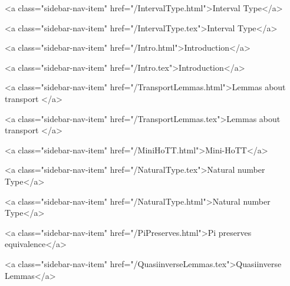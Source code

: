       
        
          <a class="sidebar-nav-item" href="/IntervalType.html">Interval Type</a>
        
      
    
      
        
          <a class="sidebar-nav-item" href="/IntervalType.tex">Interval Type</a>
        
      
    
      
        
          <a class="sidebar-nav-item" href="/Intro.html">Introduction</a>
        
      
    
      
        
          <a class="sidebar-nav-item" href="/Intro.tex">Introduction</a>
        
      
    
      
        
          <a class="sidebar-nav-item" href="/TransportLemmas.html">Lemmas about transport </a>
        
      
    
      
        
          <a class="sidebar-nav-item" href="/TransportLemmas.tex">Lemmas about transport </a>
        
      
    
      
        
          <a class="sidebar-nav-item" href="/MiniHoTT.html">Mini-HoTT</a>
        
      
    
      
        
          <a class="sidebar-nav-item" href="/NaturalType.tex">Natural number Type</a>
        
      
    
      
        
          <a class="sidebar-nav-item" href="/NaturalType.html">Natural number Type</a>
        
      
    
      
        
          <a class="sidebar-nav-item" href="/PiPreserves.html">Pi preserves equivalence</a>
        
      
    
      
        
          <a class="sidebar-nav-item" href="/QuasiinverseLemmas.tex">Quasiinverse Lemmas</a>
        

